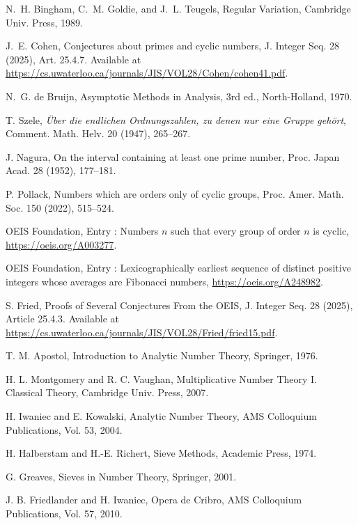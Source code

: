 \begin{thebibliography}{99}

N.~H. Bingham, C.~M. Goldie, and J.~L. Teugels, Regular Variation, Cambridge Univ. Press, 1989.

J.~E. Cohen, Conjectures about primes and cyclic numbers, J. Integer Seq. 28 (2025), Art. 25.4.7. Available at \url{https://cs.uwaterloo.ca/journals/JIS/VOL28/Cohen/cohen41.pdf}.

N.~G. de Bruijn, Asymptotic Methods in Analysis, 3rd ed., North-Holland, 1970.

T. Szele, \emph{\"Uber die endlichen Ordnungszahlen, zu denen nur eine Gruppe geh\"ort}, Comment. Math. Helv. 20 (1947), 265--267.

J. Nagura, On the interval containing at least one prime number, Proc. Japan Acad. 28 (1952), 177--181.

P. Pollack, Numbers which are orders only of cyclic groups, Proc. Amer. Math. Soc. 150 (2022), 515--524.

OEIS Foundation, Entry : Numbers $n$ such that every group of order $n$ is cyclic, \url{https://oeis.org/A003277}.

OEIS Foundation, Entry : Lexicographically earliest sequence of distinct positive integers whose averages are Fibonacci numbers, \url{https://oeis.org/A248982}.

S. Fried, Proofs of Several Conjectures From the OEIS, J. Integer Seq. 28 (2025), Article 25.4.3. Available at \url{https://cs.uwaterloo.ca/journals/JIS/VOL28/Fried/fried15.pdf}.

T. M. Apostol, Introduction to Analytic Number Theory, Springer, 1976.

H. L. Montgomery and R. C. Vaughan, Multiplicative Number Theory I. Classical Theory, Cambridge Univ. Press, 2007.

H. Iwaniec and E. Kowalski, Analytic Number Theory, AMS Colloquium Publications, Vol. 53, 2004.

H. Halberstam and H.-E. Richert, Sieve Methods, Academic Press, 1974.

G. Greaves, Sieves in Number Theory, Springer, 2001.

J. B. Friedlander and H. Iwaniec, Opera de Cribro, AMS Colloquium Publications, Vol. 57, 2010.


\end{thebibliography}
